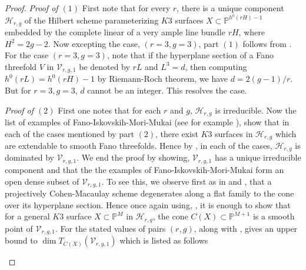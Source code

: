 \documentclass[11pt,twoside]{amsart}
\theoremstyle{plain}
\numberwithin{equation}{section}
\theoremstyle{definition}
\begin{document}
\begin{proof}
  \noindent\textit{Proof of $(1)$} First note that for every $r$, there is a unique component $\mathcal{H}_{r,g}$ of the Hilbert scheme parameterizing $K3$ surfaces $X \subset \mathbb{P}^{h^0(rH)-1}$ embedded by the complete linear of a very ample line bundle $rH$, where $H^2 = 2g-2$. Now excepting the case, $(r = 3, g = 3)$, part $(1)$ follows from . For the case $(r=3, g=3)$, note that if the hyperplane section of a Fano threefold $V$ in $\mathcal{V}_{r,g,1}$ be denoted by $rL$ and $L^3 = d$, then computing $h^0(rL) = h^0(rH)-1$ by Riemann-Roch theorem, we have $d = 2(g-1)/r$. But for $r = 3, g = 3$, $d$ cannot be an integer. This resolves the case. \par
  \textit{Proof of $(2)$} First one notes that for each $r$ and $g$, $\mathcal{H}_{r,g}$ is irreducible. Now the list of examples of Fano-Iskovskih-Mori-Mukai (see for example \cite[Table $3.1$]{CLM98}), show that in each of the cases mentioned by part $(2)$, there exist $K3$ surfaces in $\mathcal{H}_{r,g}$ which are extendable to smooth Fano threefolds. Hence by , in each of the cases, $\mathcal{H}_{r,g}$ is dominated by $\mathcal{V}_{r,g,1}$. We end the proof by showing, $\mathcal{V}_{r,g,1}$ has a unique irreducible component and that the the examples of Fano-Iskovskih-Mori-Mukai form an open dense subset of $\mathcal{V}_{r,g,1}$.  To see this, we observe first as in \cite{CLM93} and \cite{CLM98}, that a projectively Cohen-Macaulay scheme degenerates along a flat family to the cone over its hyperplane section. Hence once again using, , it is enough to show that for a general $K3$ surface $X \subset \mathbb{P}^{M}$ in $\mathcal{H}_{r,g}$, the cone $C(X) \subset \mathbb{P}^{M+1}$ is a smooth point of $\mathcal{V}_{r,g,1}$. For the stated values of pairs $(r,g)$, 
   along with , gives an upper bound to $\operatorname{dim}T_{C(X)}(\mathcal{V}_{r,g,1})$ which is listed as follows 
  \begin{enumerate}



\end{enumerate}
\end{proof}
\end{document}
